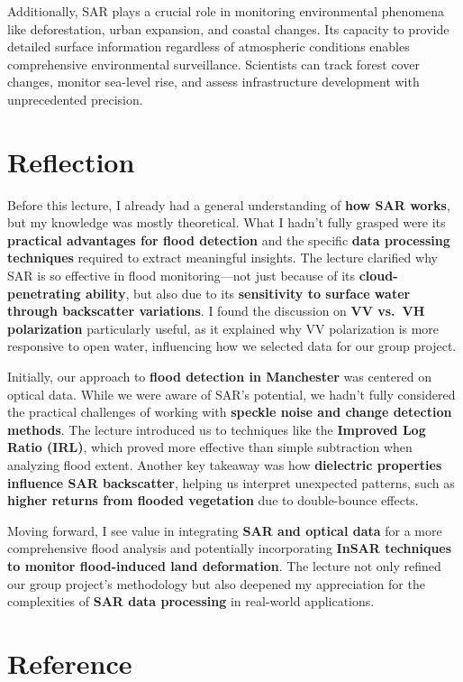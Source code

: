 \documentclass[
  letterpaper,
]{scrbook}
\begin{document}
Additionally, SAR plays a crucial role in monitoring environmental
phenomena like deforestation, urban expansion, and coastal changes. Its
capacity to provide detailed surface information regardless of
atmospheric conditions enables comprehensive environmental surveillance.
Scientists can track forest cover changes, monitor sea-level rise, and
assess infrastructure development with unprecedented precision.

\section{Reflection}\label{reflection-6}

Before this lecture, I already had a general understanding of
\textbf{how SAR works}, but my knowledge was mostly theoretical. What I
hadn't fully grasped were its \textbf{practical advantages for flood
detection} and the specific \textbf{data processing techniques} required
to extract meaningful insights. The lecture clarified why SAR is so
effective in flood monitoring---not just because of its
\textbf{cloud-penetrating ability}, but also due to its
\textbf{sensitivity to surface water through backscatter variations}. I
found the discussion on \textbf{VV vs.~VH polarization} particularly
useful, as it explained why VV polarization is more responsive to open
water, influencing how we selected data for our group project.

Initially, our approach to \textbf{flood detection in Manchester} was
centered on optical data. While we were aware of SAR's potential, we
hadn't fully considered the practical challenges of working with
\textbf{speckle noise and change detection methods}. The lecture
introduced us to techniques like the \textbf{Improved Log Ratio (IRL)},
which proved more effective than simple subtraction when analyzing flood
extent. Another key takeaway was how \textbf{dielectric properties
influence SAR backscatter}, helping us interpret unexpected patterns,
such as \textbf{higher returns from flooded vegetation} due to
double-bounce effects.

Moving forward, I see value in integrating \textbf{SAR and optical data}
for a more comprehensive flood analysis and potentially incorporating
\textbf{InSAR techniques to monitor flood-induced land deformation}. The
lecture not only refined our group project's methodology but also
deepened my appreciation for the complexities of \textbf{SAR data
processing} in real-world applications.

\section*{Reference}\label{reference-5}
\end{document}
